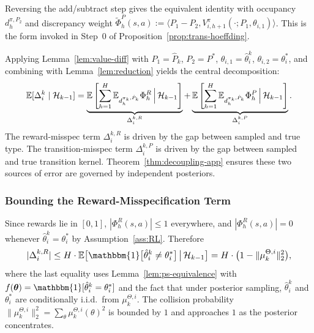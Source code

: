 \begin{remark}
\label{rem:value-diff-symmetric}
Reversing the add/subtract step gives the equivalent identity with occupancy $d_h^{\pi,P_2}$ and discrepancy weight $\tilde\Phi_h^P(s,a) := \langle P_1-P_2, V_{i,h+1}^\pi(\cdot;P_1,\theta_{i,1})\rangle$. This is the form invoked in Step~0 of Proposition~\ref{prop:trans-hoeffding}.
\end{remark}

Applying Lemma~\ref{lem:value-diff} with $P_1 = \hat{P}_k$, $P_2 = P^*$, $\theta_{i,1} = \hat{\theta}_i^k$, $\theta_{i,2} = \theta_i^*$, and combining with Lemma~\ref{lem:reduction} yields the central decomposition:
\begin{equation}\label{eq:central-decomp}\resizebox{0.9\linewidth}{!}{$\displaystyle \mathbb{E}[\Delta_i^k \mid \mathcal{H}_{k-1}] = \underbrace{\mathbb{E}\left[\sum_{h=1}^H \mathbb{E}_{d_h^{\pi_k, \hat{P}_k}}\Phi_h^R \,\Big|\, \mathcal{H}_{k-1}\right]}_{\Delta_i^{k,R}} + \underbrace{\mathbb{E}\left[\sum_{h=1}^H \mathbb{E}_{d_h^{\pi_k, \hat{P}_k}}\Phi_h^P \,\Big|\, \mathcal{H}_{k-1}\right]}_{\Delta_i^{k,P}}. $}\end{equation}
The reward-misspec term $\Delta_i^{k,R}$ is driven by the gap between sampled and true type. The transition-misspec term $\Delta_i^{k,P}$ is driven by the gap between sampled and true transition kernel. Theorem~\ref{thm:decoupling-app} ensures these two sources of error are governed by independent posteriors.

\subsubsection{Bounding the Reward-Misspecification Term}

Since rewards lie in $[0, 1]$, $|\Phi_h^R(s, a)| \leq 1$ everywhere, and $|\Phi_h^R(s, a)| = 0$ whenever $\hat{\theta}_i^k = \theta_i^*$ by Assumption~\ref{ass:RL}. Therefore
\begin{equation}\resizebox{0.9\linewidth}{!}{$\displaystyle |\Delta_i^{k,R}| \leq H \cdot \mathbb{E}\big[\mathbbm{1}\big[\hat{\theta}_i^k \neq \theta_i^*\big] \,\big|\, \mathcal{H}_{k-1}\big] = H \cdot \big(1 - \|\mu_k^{\Theta,i}\|_2^2\big), $}\end{equation}
where the last equality uses Lemma~\ref{lem:ps-equivalence} with $f(\boldsymbol{\theta}) = \mathbbm{1}[\hat{\theta}_i^k = \theta_i^*]$ and the fact that under posterior sampling, $\hat{\theta}_i^k$ and $\theta_i^*$ are conditionally i.i.d.\ from $\mu_k^{\Theta,i}$. The collision probability $\|\mu_k^{\Theta,i}\|_2^2 = \sum_\theta \mu_k^{\Theta,i}(\theta)^2$ is bounded by $1$ and approaches $1$ as the posterior concentrates.

